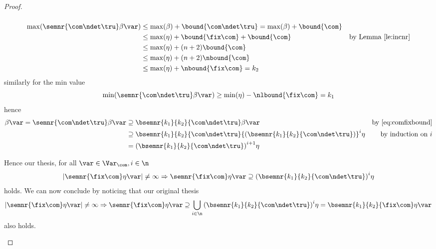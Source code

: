 \begin{proof}
\begin{inductive}
\begin{description}
\begin{equation}
      \end{equation}
      \begin{align*}
        \max(\semnr{\com\ndet\tru}\beta\var) & \leq \max(\beta) + \bound{\com\ndet\tru} = \max(\beta) + \bound{\com} \\
                                             & \leq \max(\eta) + \bound{\fix\com} + \bound{\com} & \text{by Lemma~\ref{le:incnr}} \\
                                             & \leq \max(\eta) + (n+2)\bound{\com} \\
                                             & \leq \max(\eta) + (n+2)\nbound{\com} \\
                                             & \leq \max(\eta) + \nbound{\fix\com} = k_2
      \end{align*}
      similarly for the min value
      \begin{equation*}
        \min(\semnr{\com\ndet\tru}\beta\var) \geq \min(\eta) - \nlbound{\fix\com} = k_1
      \end{equation*}
      hence
      \begin{align*}
        \beta\var = \semnr{\com\ndet\tru}\beta\var & \supseteq \bsemnr{k_1}{k_2}{\com\ndet\tru}\beta\var & \text{by~\eqref{eq:comfixbound}}\\
                                                   & \supseteq \bsemnr{k_1}{k_2}{\com\ndet\tru}{\left(\bsemnr{k_1}{k_2}{\com\ndet\tru}\right)}^i\eta & \text{by induction on } i\\
                                                   & = {\left(\bsemnr{k_1}{k_2}{\com\ndet\tru}\right)}^{i+1}\eta
      \end{align*}
    \end{description}
    Hence our thesis, for all \(\var \in \Var_{\com}, i \in \n\)
    \begin{equation*}
      |\semnr{\fix\com}\eta\var| \neq \infty \Rightarrow
      \semnr{\fix\com}\eta\var \supseteq
      {\left(\bsemnr{k_1}{k_2}{\com\ndet\tru}\right)}^i\eta
    \end{equation*}
    holds.  We can now conclude by noticing that our original thesis
    \begin{equation*}
      |\semnr{\fix\com}\eta\var| \neq \infty \Rightarrow
      \semnr{\fix\com}\eta\var \supseteq
      \bigcup_{i\in\n}{\left(\bsemnr{k_1}{k_2}{\com\ndet\tru}\right)}^i\eta =
      \bsemnr{k_1}{k_2}{\fix\com}\eta\var
    \end{equation*}
    also holds.
  \end{inductive}
\end{proof}

